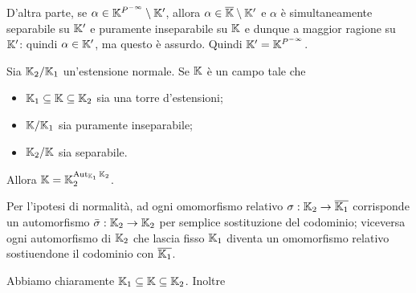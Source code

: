 \par D'altra parte, se $\alpha \in \PerfectClosure{\Field} \SetMin \Field'$, allora $\alpha \in \AlgebraicClosure{\Field} \SetMin \Field'$ e $\alpha$ \`e simultaneamente separabile su $\Field'$ e puramente inseparabile su $\Field$ e dunque a maggior ragione su $\Field'$: quindi $\alpha \in \Field'$, ma questo \`e assurdo. Quindi $\Field' = \PerfectClosure{\Field}$. \EndProof
\begin{Theorem}
	Sia $\FieldExtension{\Field_2}{\Field_1}$ un'estensione normale. Se $\Field$ \`e un campo tale che
	\begin{itemize}
		\item $\Field_1 \subseteq \Field \subseteq \Field_2$ sia una torre d'estensioni;
		\item $\FieldExtension{\Field}{\Field_1}$ sia puramente inseparabile;
		\item $\FieldExtension{\Field_2}{\Field}$ sia separabile.
	\end{itemize}
	Allora $\Field = \Fixed{\Field_2}{\RelativeAutomorphisms{\Field_2}{\Field_1}}$.
\end{Theorem}
\Proof Per l'ipotesi di normalit\`a, ad ogni omomorfismo relativo $\RelativeHomomorphism: \Field_2 \rightarrow \AlgebraicClosure{\Field_1}$ corrisponde un automorfismo $\bar{\RelativeHomomorphism}: \Field_2 \rightarrow \Field_2$ per semplice sostituzione del codominio; viceversa ogni automorfismo di $\Field_2$ che lascia fisso $\Field_1$ diventa un omomorfismo relativo sostiuendone il codominio con $\AlgebraicClosure{\Field_1}$.
\par Abbiamo chiaramente $\Field_1 \subseteq \Field \subseteq \Field_2$. Inoltre
